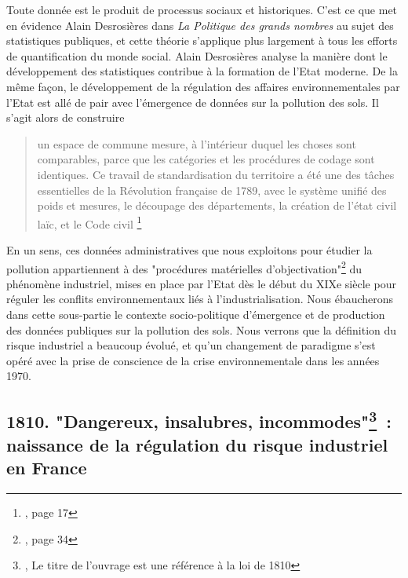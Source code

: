 \documentclass[a4paper,twoside,12pt]{book}
\begin{document}
Toute donnée est le produit de processus sociaux et historiques. C'est ce que met en évidence Alain Desrosières dans \textit{La Politique des grands nombres} au sujet des statistiques publiques, et cette théorie s'applique plus largement à tous les efforts de quantification du monde social. Alain Desrosières analyse la manière dont le développement des statistiques contribue à la formation de l'Etat moderne. De la même façon, le développement de la régulation des affaires environnementales par l'Etat est allé de pair avec l'émergence de données sur la pollution des sols. Il s'agit alors de construire 

\vspace{1em}
\begin{quote}
\og{} un espace de commune mesure, à l'intérieur duquel les choses sont comparables, parce que les catégories et les procédures de codage sont identiques. Ce travail de standardisation du territoire a été une des tâches essentielles de la Révolution française de 1789, avec le système unifié des poids et mesures, le découpage des départements, la création de l'état civil laïc, et le Code civil \fg{} \footnote{\cite{desrosieres_politique_2010}, page 17}
\end{quote}
\vspace{1em}


En un sens, ces données administratives que nous exploitons pour étudier la pollution appartiennent à des "procédures matérielles d'objectivation"\footnote{\cite{desrosieres_politique_2010}, page 34} du phénomène industriel, mises en place par l'Etat dès le début du XIXe siècle pour réguler les conflits environnementaux liés à l'industrialisation. Nous ébaucherons dans cette sous-partie le contexte socio-politique d'émergence et de production des données publiques sur la pollution des sols. Nous verrons que la définition du risque industriel a beaucoup évolué, et qu'un changement de paradigme s'est opéré avec la prise de conscience de la crise environnementale dans les années 1970. 

\subsection{1810. "Dangereux, insalubres, incommodes"\thanks{\cite{guillerme_dangereux_2004}, Le titre de l'ouvrage est une référence à la loi de 1810} : naissance de la régulation du risque industriel en France}
\end{document}
